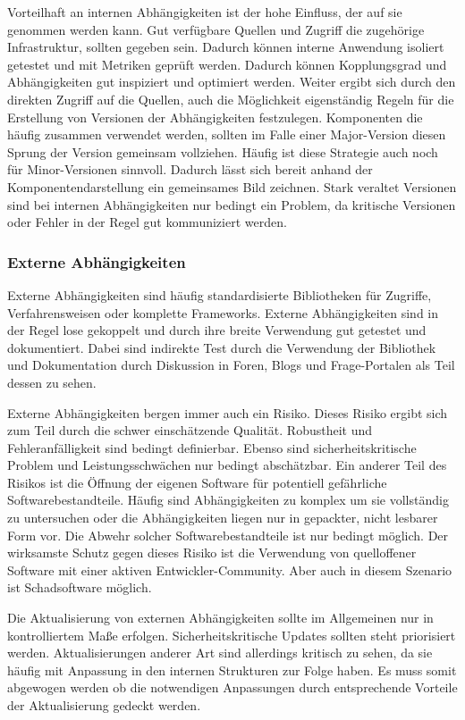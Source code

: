 Vorteilhaft an internen Abhängigkeiten ist der hohe Einfluss, der auf sie genommen werden kann. Gut verfügbare Quellen und Zugriff die zugehörige Infrastruktur, sollten gegeben sein. Dadurch können interne Anwendung isoliert getestet und mit Metriken geprüft werden. Dadurch können Kopplungsgrad und Abhängigkeiten gut inspiziert und optimiert werden. Weiter ergibt sich durch den direkten Zugriff auf die Quellen, auch die Möglichkeit eigenständig Regeln für die Erstellung von Versionen der Abhängigkeiten festzulegen. Komponenten die häufig zusammen verwendet werden, sollten im Falle einer Major-Version diesen Sprung der Version gemeinsam vollziehen. Häufig ist diese Strategie auch noch für Minor-Versionen sinnvoll. Dadurch lässt sich bereit anhand der Komponentendarstellung ein gemeinsames Bild zeichnen. Stark veraltet Versionen sind bei internen Abhängigkeiten nur bedingt ein Problem, da kritische Versionen oder Fehler in der Regel gut kommuniziert werden.

\subsubsection{Externe Abhängigkeiten}

Externe Abhängigkeiten sind häufig standardisierte Bibliotheken für Zugriffe, Verfahrensweisen oder komplette Frameworks. Externe Abhängigkeiten sind in der Regel lose gekoppelt und durch ihre breite Verwendung gut getestet und dokumentiert. Dabei sind indirekte Test durch die Verwendung der Bibliothek und Dokumentation durch Diskussion in Foren, Blogs und Frage-Portalen als Teil dessen zu sehen. 

Externe Abhängigkeiten bergen immer auch ein Risiko. Dieses Risiko ergibt sich zum Teil durch die schwer einschätzende Qualität. Robustheit und Fehleranfälligkeit sind bedingt definierbar. Ebenso sind sicherheitskritische Problem und Leistungsschwächen nur bedingt abschätzbar. Ein anderer Teil des Risikos ist die Öffnung der eigenen Software für potentiell gefährliche Softwarebestandteile. Häufig sind Abhängigkeiten zu komplex um sie vollständig zu untersuchen oder die Abhängigkeiten liegen nur in gepackter, nicht lesbarer Form vor. Die Abwehr solcher Softwarebestandteile ist nur bedingt möglich. Der wirksamste Schutz gegen dieses Risiko ist die Verwendung von quelloffener Software mit einer aktiven Entwickler-Community. Aber auch in diesem Szenario ist Schadsoftware möglich.

Die Aktualisierung von externen Abhängigkeiten sollte im Allgemeinen nur in kontrolliertem Maße erfolgen. Sicherheitskritische Updates sollten steht priorisiert werden. Aktualisierungen anderer Art sind allerdings kritisch zu sehen, da sie häufig mit Anpassung in den internen Strukturen zur Folge haben. Es muss somit abgewogen werden ob die notwendigen Anpassungen durch entsprechende Vorteile der Aktualisierung gedeckt werden.

